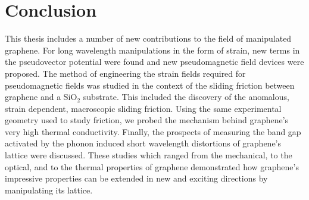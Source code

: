 \chapter{Conclusion}
This thesis includes a number of new contributions to the field of manipulated grap\-hene.
For long wavelength manipulations in the form of strain, new terms in the pseudovector potential were found and new pseudomagnetic field devices were proposed.
The method of engineering the strain fields required for pseudomagnetic fields was studied in the context of the sliding friction between graphene and a SiO$_2$ substrate.
This included the discovery of the anomalous, strain dependent, macroscopic sliding friction.
Using the same experimental geometry used to study friction, we probed the mechanism behind graphene's very high thermal conductivity.
Finally, the prospects of measuring the band gap activated by the phonon induced short wavelength distortions of graphene's lattice were discussed.
These studies which ranged from the mechanical, to the optical, and to the thermal properties of graphene demonstrated how graphene's impressive properties can be extended in new and exciting directions by manipulating its lattice.